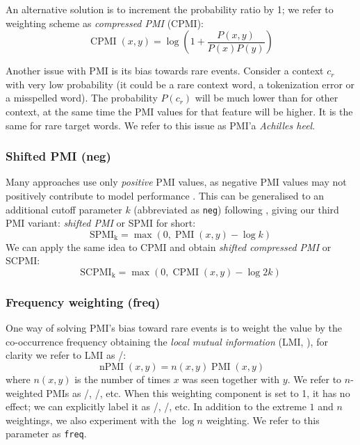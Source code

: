 An alternative solution is to increment the probability ratio by 1; we refer to weighting scheme as \emph{compressed PMI} (CPMI):
%
\begin{equation}
  \label{eq:cpmi}
  \operatorname{CPMI}(x, y) = \log\left( 1 +  \frac{P(x,y)}{P(x)P(y)} \right)
\end{equation}

Another issue with PMI is its bias towards rare events. Consider a context $c_r$  with very low probability (it could be a rare context word, a tokenization error or a misspelled word). The probability $P(c_r)$ will be much lower than for other context, at the same time the PMI values for that feature will be higher. It is the same for rare target words. We refer to this issue as PMI'a \textit{Achilles heel}.

\subsubsection{Shifted PMI (neg)}
\label{sec:shifted-pmi}

Many approaches use only \emph{positive} PMI values, as  negative PMI values may not positively contribute to model performance \cite{Turney:2010:FMV:1861751.1861756}. This can be generalised to an additional cutoff parameter $k$ (abbreviated as \texttt{neg}) following , giving our third PMI variant: \emph{shifted PMI} or SPMI for short:
%
\begin{equation}
  \label{eq:ppmi}
  \operatorname{SPMI_k} = \max (0, \operatorname{PMI}(x, y) - \log k)
\end{equation}
%
We can apply the same idea to CPMI and obtain \emph{shifted compressed PMI} or SCPMI:
%
\begin{equation}
  \label{eq:pcpmi}
  \operatorname{SCPMI_k} = \max (0, \operatorname{CPMI}(x, y) - \log 2k)
\end{equation}

\subsubsection{Frequency weighting (freq)}
\label{sec:frequency-weighting}

One way of solving PMI's bias toward rare events is to weight the value by the co-occurrence frequency obtaining the \emph{local mutual information} (LMI, ), for clarity we refer to LMI as \NPMI/:
%
\begin{equation}
  \label{eq:lmi}
  \operatorname{nPMI}(x, y) = n(x, y)\operatorname{PMI}(x, y)
\end{equation}
%
where $n(x, y)$ is the number of times $x$ was seen together with $y$. We refer to $n$-weighted PMIs as \NPMI/, \NSPMI/, etc. When this weighting component is set to 1, it has no effect; we can explicitly label it as \PMI/, \SPMI/, etc. In addition to the extreme $1$ and $n$ weightings, we also experiment with the $\log n$ weighting. We refer to this parameter as \texttt{freq}.

